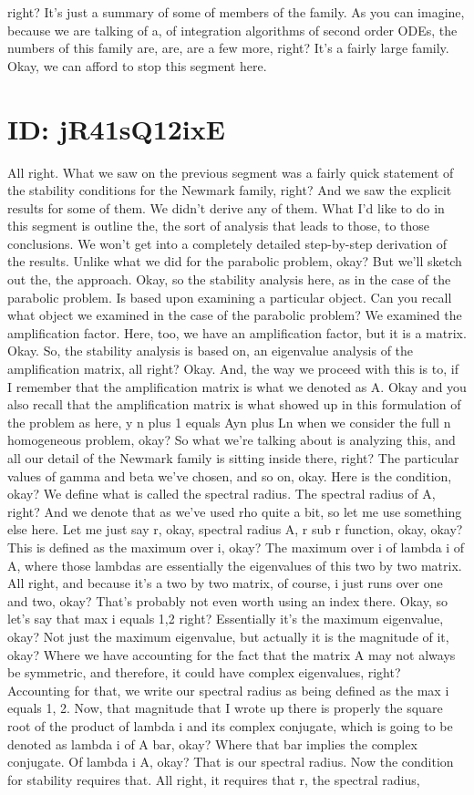 \documentclass[10pt]{article}
\begin{document}
right? It's just a summary of some of members of the family. As you can imagine, because we are talking of a, of integration algorithms of second order ODEs, the numbers of this family are, are, are a few more, right? It's a fairly large family. Okay, we can afford to stop this segment here.

\section*{ID: jR41sQ12ixE}
All right. What we saw on the previous segment was a fairly quick statement of the stability conditions for the Newmark family, right? And we saw the explicit results for some of them. We didn't derive any of them. What I'd like to do in this segment is outline the, the sort of analysis that leads to those, to those conclusions. We won't get into a completely detailed step-by-step derivation of the results. Unlike what we did for the parabolic problem, okay? But we'll sketch out the, the approach. Okay, so the stability analysis here, as in the case of the parabolic problem. Is based upon examining a particular object. Can you recall what object we examined in the case of the parabolic problem? We examined the amplification factor. Here, too, we have an amplification factor, but it is a matrix. Okay. So, the stability analysis is based on, an eigenvalue analysis of the amplification matrix, all right? Okay. And, the way we proceed with this is to, if I remember that the amplification matrix is what we denoted as A. Okay and you also recall that the amplification matrix is what showed up in this formulation of the problem as here, y n plus 1 equals Ayn plus Ln when we consider the full n homogeneous problem, okay? So what we're talking about is analyzing this, and all our detail of the Newmark family is sitting inside there, right? The particular values of gamma and beta we've chosen, and so on, okay. Here is the condition, okay? We define what is called the spectral radius. The spectral radius of A, right? And we denote that as we've used rho quite a bit, so let me use something else here. Let me just say r, okay, spectral radius A, r sub r function, okay, okay? This is defined as the maximum over i, okay? The maximum over i of lambda i of A, where those lambdas are essentially the eigenvalues of this two by two matrix. All right, and because it's a two by two matrix, of course, i just runs over one and two, okay? That's probably not even worth using an index there. Okay, so let's say that max i equals 1,2 right? Essentially it's the maximum eigenvalue, okay? Not just the maximum eigenvalue, but actually it is the magnitude of it, okay? Where we have accounting for the fact that the matrix A may not always be symmetric, and therefore, it could have complex eigenvalues, right? Accounting for that, we write our spectral radius as being defined as the max i equals 1, 2. Now, that magnitude that I wrote up there is properly the square root of the product of lambda i and its complex conjugate, which is going to be denoted as lambda i of A bar, okay? Where that bar implies the complex conjugate. Of lambda i A, okay? That is our spectral radius. Now the condition for stability requires that. All right, it requires that r, the spectral radius, 
\end{document}
